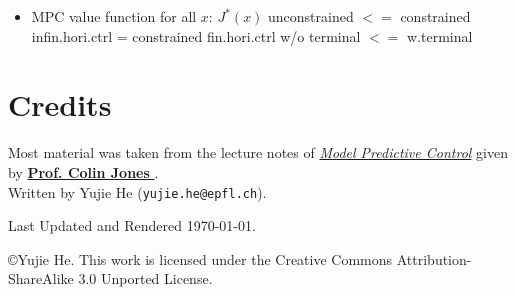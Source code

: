 \documentclass[10pt,a4paper,landscape]{article}
\newcommand{\quadRule}{\vspace{-3pt}\rule{0.23\textwidth}{0.4pt}}
\begin{document}
\begin{multicols*}{4}
\begin{itemize}
    \quadRule
    
    \item MPC value function for all $x$: $J^*(x)$ unconstrained $<=$ constrained infin.hori.ctrl = constrained fin.hori.ctrl w/o terminal $<=$ w.terminal
\end{itemize}


\section{Credits}
Most material was taken from the lecture notes of \href{https://edu.epfl.ch/coursebook/fr/model-predictive-control-ME-425}{\textit{Model Predictive Control}} given by \href{https://people.epfl.ch/colin.jones}{\textbf{Prof. Colin Jones
}}.\\
%
Written by Yujie He (\texttt{yujie.he@epfl.ch}).

Last Updated and Rendered \today. 

\copyright Yujie He. This work is licensed under the Creative Commons Attribution-ShareAlike 3.0 Unported License.

\end{multicols*}
\end{document}
